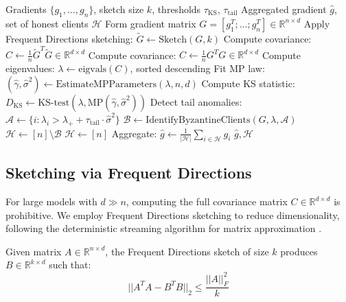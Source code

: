 \documentclass[runningheads]{llncs}
\begin{document}
\begin{algorithm}[htbp]
\caption{our approach Aggregation}
\label{alg:spectral_sentinel}
\begin{algorithmic}[1]
\Require Gradients $\{g_1, \ldots, g_n\}$, sketch size $k$, thresholds $\tau_{\text{KS}}$, $\tau_{\text{tail}}$
\Ensure Aggregated gradient $\hat{g}$, set of honest clients $\mathcal{H}$
\State Form gradient matrix $G = [g_1^T; \ldots; g_n^T] \in \mathbb{R}^{n \times d}$
    \State Apply Frequent Directions sketching: $\tilde{G} \leftarrow \text{Sketch}(G, k)$
    \State Compute covariance: $C \leftarrow \frac{1}{n}\tilde{G}^T \tilde{G} \in \mathbb{R}^{d \times d}$
\Else
    \State Compute covariance: $C \leftarrow \frac{1}{n}G^T G \in \mathbb{R}^{d \times d}$
\EndIf
\State Compute eigenvalues: $\lambda \leftarrow \text{eigvals}(C)$, sorted descending
\State Fit MP law: $(\hat{\gamma}, \hat{\sigma}^2) \leftarrow \text{EstimateMPParameters}(\lambda, n, d)$
\State Compute KS statistic: $D_{\text{KS}} \leftarrow \text{KS-test}(\lambda, \text{MP}(\hat{\gamma}, \hat{\sigma}^2))$
\State Detect tail anomalies: $\mathcal{A} \leftarrow \{i : \lambda_i > \lambda_+ + \tau_{\text{tail}} \cdot \hat{\sigma}^2\}$
    \State $\mathcal{B} \leftarrow \text{IdentifyByzantineClients}(G, \lambda, \mathcal{A})$
    \State $\mathcal{H} \leftarrow [n] \setminus \mathcal{B}$
\Else
    \State $\mathcal{H} \leftarrow [n]$ 
\EndIf
\State Aggregate: $\hat{g} \leftarrow \frac{1}{|\mathcal{H}|} \sum_{i \in \mathcal{H}} g_i$
\State \Return $\hat{g}, \mathcal{H}$
\end{algorithmic}
\end{algorithm}

\subsection{Sketching via Frequent Directions}

For large models with $d \gg n$, computing the full covariance matrix $C \in \mathbb{R}^{d \times d}$ is prohibitive. We employ Frequent Directions sketching \cite{frequent_directions} to reduce dimensionality, following the deterministic streaming algorithm for matrix approximation \cite{streaming_sketch}.

\begin{definition}
Given matrix $A \in \mathbb{R}^{n \times d}$, the Frequent Directions sketch of size $k$ produces $B \in \mathbb{R}^{k \times d}$ such that:
\begin{equation}
||A^T A - B^T B||_2 \leq \frac{||A||_F^2}{k}
\end{equation}
\end{definition}
\end{document}
